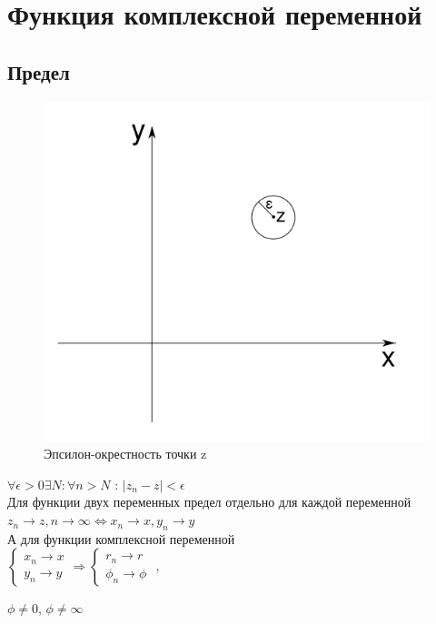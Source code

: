 \documentclass{article}
\begin{document}
         \section{Функция комплексной переменной}
            \subsection{Предел}
                \begin{figure}[h]
                  \includegraphics[width=0.6\linewidth]{complex_epsilon_example}
                  \caption{Эпсилон-окрестность точки z}
                  \label{ris:complex_epsolon_example}
                \end{figure}
                $\forall \epsilon > 0 \exists N : \forall n>N $ : 
                $|z_{n}-z|< \epsilon$\\
             Для функции двух переменных предел отдельно для каждой переменной $ z_{n} \rightarrow z,n \rightarrow \infty \Leftrightarrow x_{n} \rightarrow x,y_{n} \rightarrow y$\\
             А для функции комплексной переменной\\ \begin{math} \begin{cases} x_{n} \rightarrow x \\ y_{n} \rightarrow y \end{cases} \Rightarrow 
             \begin{cases} r_{n} \rightarrow r \\ \phi_{n} \rightarrow \phi \end{cases} \end{math}
              , \begin{nobreak} $\phi \neq 0$, $\phi \neq \infty$ \end{nobreak} 
              \newpage
\end{document}
